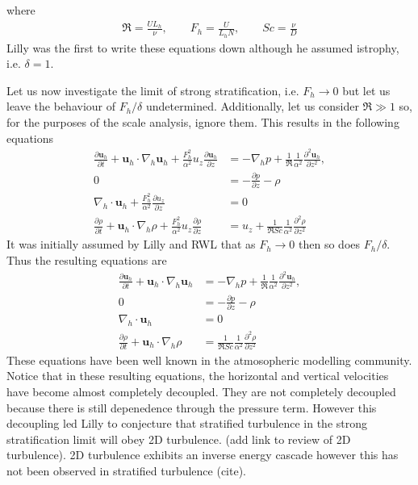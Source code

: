 where 
\begin{align}
\Re = \frac{UL_{h}}{\nu}, \qquad F_{h} = \frac{U}{L_{h}N},\qquad Sc = \frac{\nu}{D}
\end{align}
Lilly was the first to write these equations down although he assumed istrophy, i.e. $\delta=1$. 

Let us now investigate the limit of strong stratification, i.e. $F_{h}\rightarrow 0$ but let us leave the behaviour of $F_{h}/\delta$ undetermined. Additionally, let us consider $\Re\gg 1$ so, for the purposes of the scale analysis, ignore them. This results in the following equations 
\begin{align}
\frac{\partial \textbf{u}_{h}}{\partial t} + \textbf{u}_{h}\cdot\nabla_{h}\textbf{u}_{h}+\frac{F_{h}^{2}}{\alpha^{2}}u_{z}\frac{\partial \textbf{u}_{h}}{\partial z} &= -\nabla_{h}p + \frac{1}{\Re}\frac{1}{\alpha^{2}}\frac{\partial^{2}\textbf{u}_{h}}{\partial z^{2}},\\
0&= -\frac{\partial p}{\partial z} - \rho  \\
\nabla_{h}\cdot\textbf{u}_{h}+ \frac{F_{h}^{2}}{\alpha^{2}}\frac{\partial u_{z}}{\partial z} &=0\\
\frac{\partial \rho}{\partial t} + \textbf{u}_{h}\cdot\nabla_{h}\rho + \frac{F_{h}^{2}}{\alpha^{2}}u_{z}\frac{\partial \rho}{\partial z} &= u_{z} + \frac{1}{\Re Sc}\frac{1}{\alpha^{2}}\frac{\partial^{2}\rho}{\partial z^{2}} 
\end{align} 
It was initially assumed by Lilly and RWL that as $F_{h}\rightarrow 0$ then so does $F_{h}/\delta$. Thus the resulting equations are 
\begin{align}
\frac{\partial \textbf{u}_{h}}{\partial t} + \textbf{u}_{h}\cdot\nabla_{h}\textbf{u}_{h} &= -\nabla_{h}p + \frac{1}{\Re}\frac{1}{\alpha^{2}}\frac{\partial^{2}\textbf{u}_{h}}{\partial z^{2}},\\
0&= -\frac{\partial p}{\partial z} - \rho  \\
\nabla_{h}\cdot\textbf{u}_{h} &=0\\
\frac{\partial \rho}{\partial t} + \textbf{u}_{h}\cdot\nabla_{h}\rho &= \frac{1}{\Re Sc}\frac{1}{\alpha^{2}}\frac{\partial^{2}\rho}{\partial z^{2}} 
\end{align} 
These equations have been well known in the atmosopheric modelling community. Notice that in these resulting equations, the horizontal and vertical velocities have become almost completely decoupled. They are not completely decoupled because there is still depenedence through the pressure term. However this decoupling led Lilly to conjecture that stratified turbulence in the strong stratification limit will obey 2D turbulence. (add link to review of 2D turbulence). 2D turbulence exhibits an inverse energy cascade however this has not been observed in stratified turbulence (cite).


